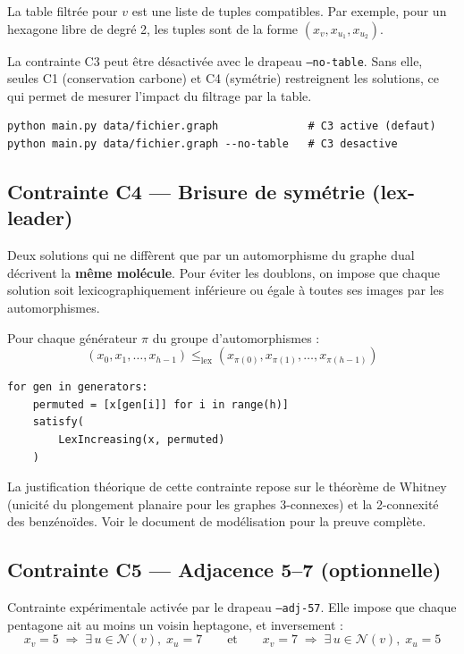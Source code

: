 La table filtrée pour $v$ est une liste de tuples compatibles. Par exemple, pour un hexagone
libre de degré 2, les tuples sont de la forme $(x_v, x_{u_1}, x_{u_2})$.

\begin{remarque}
  La contrainte C3 peut être désactivée avec le drapeau \texttt{--no-table}. Sans elle,
  seules C1 (conservation carbone) et C4 (symétrie) restreignent les solutions, ce qui
  permet de mesurer l'impact du filtrage par la table.
  \begin{lstlisting}[style=benzai]
python main.py data/fichier.graph              # C3 active (defaut)
python main.py data/fichier.graph --no-table   # C3 desactive
  \end{lstlisting}
\end{remarque}

\subsection{Contrainte C4 — Brisure de symétrie (lex-leader)}

Deux solutions qui ne diffèrent que par un automorphisme du graphe dual décrivent la
\textbf{même molécule}. Pour éviter les doublons, on impose que chaque solution soit
lexicographiquement inférieure ou égale à toutes ses images par les automorphismes.

Pour chaque générateur $\pi$ du groupe d'automorphismes :
\[
  (x_0, x_1, \ldots, x_{h-1}) \leq_{\text{lex}} (x_{\pi(0)}, x_{\pi(1)}, \ldots, x_{\pi(h-1)})
\]

\begin{lstlisting}
for gen in generators:
    permuted = [x[gen[i]] for i in range(h)]
    satisfy(
        LexIncreasing(x, permuted)
    )
\end{lstlisting}

\begin{remarque}
  La justification théorique de cette contrainte repose sur le théorème de Whitney
  (unicité du plongement planaire pour les graphes 3-connexes) et la 2-connexité des
  benzénoïdes. Voir le document de modélisation pour la preuve complète.
\end{remarque}

\subsection{Contrainte C5 — Adjacence 5--7 (optionnelle)}

Contrainte expérimentale activée par le drapeau \texttt{--adj-57}. Elle impose que chaque
pentagone ait au moins un voisin heptagone, et inversement :
\[
  x_v = 5 \;\Longrightarrow\; \exists\, u \in \mathcal{N}(v),\; x_u = 7
  \qquad\text{et}\qquad
  x_v = 7 \;\Longrightarrow\; \exists\, u \in \mathcal{N}(v),\; x_u = 5
\]

